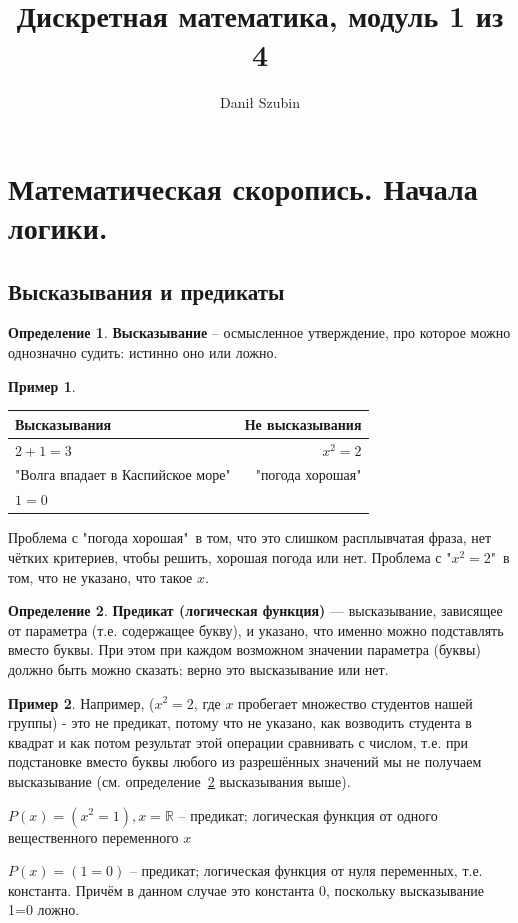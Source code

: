 \documentclass[12pt,oneside]{article}
\title{Дискретная математика, модуль 1 из 4}
\author{Danił Szubin}
\theoremstyle{definition}
\newtheorem{definition}{Определение}
\newtheorem{exmp}{Пример}[section]
\begin{document}
\maketitle
\footnotesize
\tableofcontents
\normalsize
\newpage
\section{Математическая скоропись. Начала логики.}
\subsection{Высказывания и предикаты}

\begin{definition} \label{statement}
\textbf{Высказывание} \--- осмысленное утверждение, про которое можно однозначно судить: истинно оно или ложно.
\end{definition}

\begin{exmp}

\begin{table}[h!]
\centering
\begin{tabular}{l|r}
Высказывания & Не высказывания \\\hline
$2+1=3$ & $x^2=2$ \\
"Волга впадает в Каспийское море" & "погода хорошая"\\
$1=0$ &  \\
\end{tabular}
\end{table}

Проблема с "погода хорошая"\ в том, что это слишком расплывчатая фраза, нет чётких критериев, чтобы решить, хорошая погода или нет. Проблема с "$x^2=2$"\ в том, что не указано, что такое $x$.
\end{exmp}

\begin{definition} \label{predicat}
\textbf{Предикат (логическая функция)} --- высказывание, зависящее от параметра (т.е. содержащее букву), и указано, что именно можно подставлять вместо буквы. При этом при каждом возможном значении параметра (буквы) должно быть можно сказать: верно это высказывание или нет. 
\end{definition}


\begin{exmp}
Например, ($x^2=2$, где $x$ пробегает множество студентов нашей группы) - это не предикат, потому что не указано, как возводить студента в квадрат и как потом результат этой операции сравнивать с числом, т.е. при подстановке вместо буквы любого из разрешённых значений мы не получаем высказывание (см. определение~\ref{predicat} высказывания выше).

$P(x) = (x^2=1), x=\mathbb{R}$ \--- предикат; логическая функция от одного вещественного переменного $x$

$P(x) = (1=0)$ \--- предикат; логическая функция от нуля переменных, т.е. константа. Причём в данном случае это константа 0, поскольку высказывание 1=0 ложно.
\end{exmp}
\end{document}
